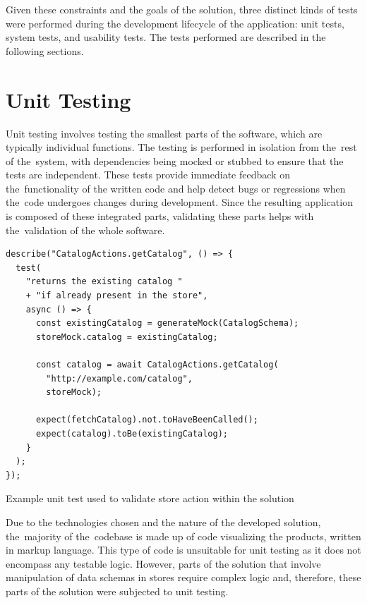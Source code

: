 Given these constraints and the goals of the solution, three distinct kinds of tests were performed during the development lifecycle of the application: unit tests, system tests, and usability tests. The tests performed are described in the following sections.


\section{Unit Testing}

Unit testing involves testing the smallest parts of the software, which are typically individual functions. The testing is performed in isolation from the~rest of the~system, with dependencies being mocked or stubbed to ensure that the tests are independent. These tests provide immediate feedback on the~functionality of the written code and help detect bugs or regressions when the~code undergoes changes during development. Since the resulting application is composed of these integrated parts, validating these parts helps with the~validation of the whole software.~\cite{Khorikov2020}

\begin{listing}[h!]
\begin{verbatim}
describe("CatalogActions.getCatalog", () => {
  test(
    "returns the existing catalog " 
    + "if already present in the store",
    async () => {
      const existingCatalog = generateMock(CatalogSchema);
      storeMock.catalog = existingCatalog;

      const catalog = await CatalogActions.getCatalog(
        "http://example.com/catalog",
        storeMock);

      expect(fetchCatalog).not.toHaveBeenCalled();
      expect(catalog).toBe(existingCatalog);
    }
  );
});
\end{verbatim}
\caption{Example unit test used to validate store action within the solution}
\label{listing:unit-test}
\end{listing}

Due to the technologies chosen and the nature of the developed solution, the~majority of the~codebase is made up of code visualizing the products, written in markup language. This type of code is unsuitable for unit testing as it does not encompass any testable logic. However, parts of the solution that involve manipulation of data schemas in stores require complex logic and, therefore, these parts of the solution were subjected to unit testing.


